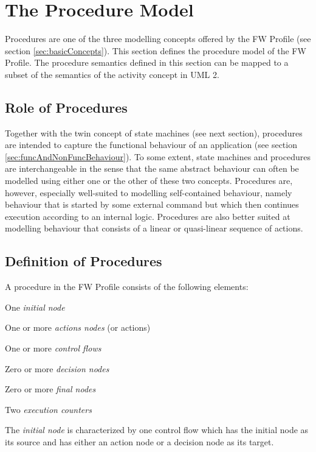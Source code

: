 \documentclass[definition]{../fwprofile}
\begin{document}
\section{The Procedure Model}
Procedures are one of the three modelling concepts offered by the FW Profile (see section \ref{sec:basicConcepts}).
This section defines the procedure model of the FW Profile. The procedure semantics defined
in this section can be mapped to a subset of the semantics of the activity concept in UML 2.

\subsection{Role of Procedures}
Together with the twin concept of state machines (see next section), procedures are intended to
capture the functional behaviour of an application (see section \ref{sec:funcAndNonFuncBehaviour}). To some extent, state
machines and procedures are interchangeable in the sense that the same abstract behaviour can
often be modelled using either one or the other of these two concepts.
Procedures are, however, especially well-suited to modelling self-contained behaviour, namely
behaviour that is started by some external command but which then continues execution
according to an internal logic. Procedures are also better suited at modelling behaviour that
consists of a linear or quasi-linear sequence of actions.

\subsection{Definition of Procedures}
A procedure in the FW Profile consists of the following elements:

\begin{fw_itemize} 
\item One \emph{initial node}
\item One or more \emph{actions nodes} (or actions)
\item One or more \emph{control flows}
\item Zero or more \emph{decision nodes}
\item Zero or more \emph{final nodes}
\item Two \emph{execution counters}
\end{fw_itemize}

The \emph{initial node} is characterized by one control flow which has the initial node as its source
and has either an action node or a decision node as its target.
\end{document}
